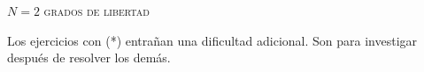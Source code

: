 \documentclass[11pt, spanish, a4paper, twopage]{article}
\begin{document}
\begin{center}
	\textsc{\LARGE \(N=2\) grados de libertad}
\end{center}


Los ejercicios con (*) entrañan una dificultad adicional. Son para investigar después de resolver los demás.

\begin{enumerate}



\end{enumerate}
\end{document}
